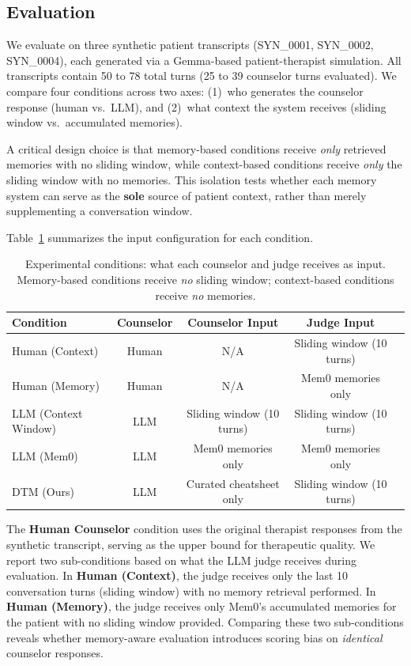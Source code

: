 \subsection{Evaluation}

We evaluate on three synthetic patient transcripts (SYN\_0001, SYN\_0002, SYN\_0004), each generated via a Gemma-based patient-therapist simulation. All transcripts contain 50 to 78 total turns (25 to 39 counselor turns evaluated). We compare four conditions across two axes: (1)~who generates the counselor response (human vs.\ LLM), and (2)~what context the system receives (sliding window vs.\ accumulated memories).

A critical design choice is that memory-based conditions receive \emph{only} retrieved memories with no sliding window, while context-based conditions receive \emph{only} the sliding window with no memories. This isolation tests whether each memory system can serve as the \textbf{sole} source of patient context, rather than merely supplementing a conversation window.

Table~\ref{tab:config} summarizes the input configuration for each condition.

\begin{table}[h]
\centering
\caption{Experimental conditions: what each counselor and judge receives as input. Memory-based conditions receive \emph{no} sliding window; context-based conditions receive \emph{no} memories.}
\label{tab:config}
\small
\begin{tabular}{lcccc}
\toprule
\textbf{Condition} & \textbf{Counselor} & \textbf{Counselor Input} & \textbf{Judge Input} \\
\midrule
Human (Context) & Human & N/A & Sliding window (10 turns) \\
Human (Memory) & Human & N/A & Mem0 memories only \\
LLM (Context Window) & LLM & Sliding window (10 turns) & Sliding window (10 turns) \\
LLM (Mem0) & LLM & Mem0 memories only & Mem0 memories only \\
DTM (Ours) & LLM & Curated cheatsheet only & Sliding window (10 turns) \\
\bottomrule
\end{tabular}
\end{table}

The \textbf{Human Counselor} condition uses the original therapist responses from the synthetic transcript, serving as the upper bound for therapeutic quality. We report two sub-conditions based on what the LLM judge receives during evaluation. In \textbf{Human (Context)}, the judge receives only the last 10 conversation turns (sliding window) with no memory retrieval performed. In \textbf{Human (Memory)}, the judge receives only Mem0's accumulated memories for the patient with no sliding window provided. Comparing these two sub-conditions reveals whether memory-aware evaluation introduces scoring bias on \emph{identical} counselor responses.

